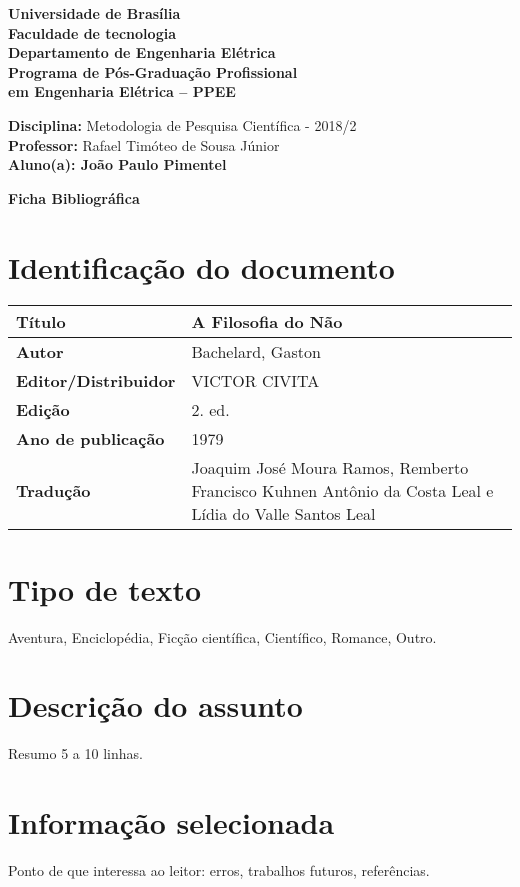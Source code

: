 \documentclass[11pt]{article}
\begin{document}
\noindent
\begin{center}
\Large\textbf{Universidade de Brasília}\\
\Large\textbf{Faculdade de tecnologia}\\
\Large\textbf{Departamento de Engenharia Elétrica}\\
\Large\textbf{Programa de Pós-Graduação Profissional \\
	em Engenharia Elétrica -- PPEE}\\
\end{center}

\large{
\noindent
\textbf{Disciplina:} Metodologia de Pesquisa Científica - 2018/2\\
\textbf{Professor:} Rafael Timóteo de Sousa Júnior \\
\textbf{Aluno(a): João Paulo Pimentel}}\\

\begin{center}
\Large\textbf{Ficha Bibliográfica}
\end{center}
\normalsize

\section{Identificação do documento}
\begin{center}
	\begin{tabular}{|l|l|} \hline
		\textbf{Título} & A Filosofia do Não\cite{Bachelard1979} \\ \hline
		\textbf{Autor} & Bachelard, Gaston \\ \hline
		\textbf{Editor/Distribuidor} & VICTOR CIVITA
 \\ \hline
		\textbf{Edição} & 2. ed. \\ \hline
		\textbf{Ano de publicação} & 1979 \\ \hline
		\textbf{Tradução} &  Joaquim José Moura Ramos, Remberto Francisco Kuhnen Antônio da Costa Leal e Lídia do Valle Santos Leal \\ \hline
	\end{tabular}
\end{center}

\section{Tipo de texto}
Aventura, Enciclopédia, Ficção científica, Científico, Romance, Outro.

\section{Descrição do assunto}
Resumo 5 a 10 linhas.

\section{Informação selecionada}
Ponto de que interessa ao leitor: erros, trabalhos futuros, referências.



\end{document}
